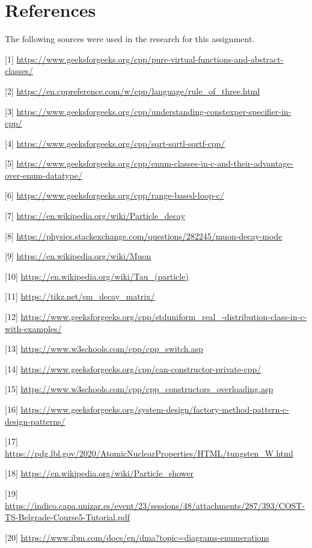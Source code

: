 \documentclass[11pt, letterpaper]{article}
\begin{document}
\newpage
\section{References}
The following sources were used in the research for this assignment.

 [1] \url{https://www.geeksforgeeks.org/cpp/pure-virtual-functions-and-abstract-classes/}

 [2] \url{https://en.cppreference.com/w/cpp/language/rule_of_three.html}

 [3] \url{https://www.geeksforgeeks.org/cpp/understanding-constexper-specifier-in-cpp/}

 [4] \url{ https://www.geeksforgeeks.org/cpp/sqrt-sqrtl-sqrtf-cpp/}

 [5] \url{https://www.geeksforgeeks.org/cpp/enum-classes-in-c-and-their-advantage-over-enum-datatype/}

 [6] \url{https://www.geeksforgeeks.org/cpp/range-based-loop-c/}

 [7] \url{https://en.wikipedia.org/wiki/Particle_decay}

 [8] \url{https://physics.stackexchange.com/questions/282245/muon-decay-mode}

 [9] \url{https://en.wikipedia.org/wiki/Muon}

 [10] \url{https://en.wikipedia.org/wiki/Tau_(particle)}

 [11] \url{https://tikz.net/sm_decay_matrix/}

 [12] \url{ https://www.geeksforgeeks.org/cpp/stduniform_real_-distribution-class-in-c-with-examples/}

 [13] \url{https://www.w3schools.com/cpp/cpp_switch.asp}

[14] \url{https://www.geeksforgeeks.org/cpp/can-constructor-private-cpp/}

[15] \url{https://www.w3schools.com/cpp/cpp_constructors_overloading.asp}

[16] \url{https://www.geeksforgeeks.org/system-design/factory-method-pattern-c-design-patterns/}

[17] \url{https://pdg.lbl.gov/2020/AtomicNuclearProperties/HTML/tungsten_W.html}

[18] \url{https://en.wikipedia.org/wiki/Particle_shower}

[19] \url{https://indico.capa.unizar.es/event/23/sessions/48/attachments/287/393/COST-TS-Belgrade-Course5-Tutorial.pdf}

[20] \url{https://www.ibm.com/docs/en/dma?topic=diagrams-enumerations}
\end{document}
